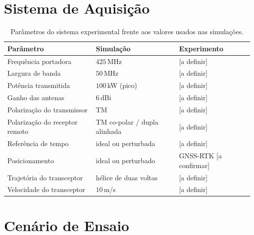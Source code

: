 \documentclass[12pt,a4paper,oneside]{book}
\theoremstyle{remark}
\theoremstyle{plain}
\theoremstyle{definition}
\begin{document}
\section{Sistema de Aquisição}
\label{sec:real_sistema}


\begin{table}[H]
\centering\small
\caption{Parâmetros do sistema experimental frente aos valores usados nas
simulações.}
\label{tab:real_parametros}
\begin{tabular}{@{}lll@{}}
\toprule
Parâmetro & Simulação & Experimento \\
\midrule
Frequência portadora & $425\,$MHz & [a definir] \\
Largura de banda & $50\,$MHz & [a definir] \\
Potência transmitida & $100\,$kW (pico) & [a definir] \\
Ganho das antenas & $6\,$dBi & [a definir] \\
Polarização do transmissor & TM & [a definir] \\
Polarização do receptor remoto & TM co-polar / dupla alinhada & [a definir] \\
Referência de tempo & ideal ou perturbada & [a definir] \\
Posicionamento & ideal ou perturbado & GNSS-RTK [a confirmar] \\
Trajetória do transceptor & hélice de duas voltas & [a definir] \\
Velocidade do transceptor & $10\,$m/s & [a definir] \\
\bottomrule
\end{tabular}
\end{table}

\section{Cenário de Ensaio}
\label{sec:real_cenario}

\end{document}
